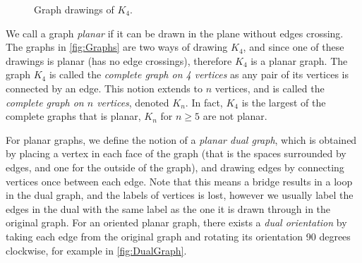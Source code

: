 \documentclass[12pt]{report}
\theoremstyle{definition}
\theoremstyle{upright}
\begin{document}
\begin{figure}[htbp]
\begin{center}
    
    \end{center}

    \caption{Graph drawings of $K_4$.}\label{fig:GraphDrawings}

\end{figure}

We call a graph \textit{planar} if it can be drawn in the plane without edges crossing.
The graphs in \cref{fig:Graphs} are two ways of drawing $K_4$, and since one of these drawings is planar (has no edge crossings), therefore $K_4$ is  a planar graph.
The graph $K_4$ is called the {\em complete graph on 4 vertices} as any pair of its vertices is connected by an edge. This notion extends to $n$ vertices, and is called the \textit{complete graph on $n$ vertices}, denoted $K_n$.
In fact, $K_4$ is the largest of the complete graphs that is planar, $K_n$ for $n\geq5$ are not planar.

For planar graphs, we define the notion of a \textit{planar dual graph}, which is obtained by placing a vertex in each face of the graph (that is the spaces surrounded by edges, and one for the outside of the graph), and drawing edges by connecting vertices once between each edge.
Note that this means a bridge results in a loop in the dual graph, and the labels of vertices is lost, however we usually label the edges in the dual with the same label as the one it is drawn through in the original graph.
For an oriented planar graph, there exists a \textit{dual orientation} by taking each edge from the original graph and rotating its orientation 90 degrees clockwise, for example in \cref{fig:DualGraph}.
\end{document}
